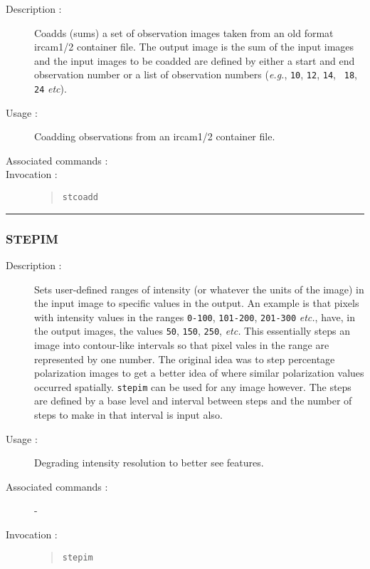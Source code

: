\begin{description}

\item[Description :] Coadds (sums) a set of observation images taken
from an old format {\sc ircam1/2} container file.  The output image is
the sum of the input images and the input images to be coadded are
defined by either a start and end observation number or a list of
observation numbers (\emph{e.g.}, {\tt 10}, {\tt 12}, {\tt 14}, {\tt
18}, {\tt 24} \emph{etc}).

\item[Usage :] Coadding observations from an {\sc ircam1/2} container file.
\item[Associated commands :] {\tt {}}
\item[Invocation :]

\begin{quote}{\tt  stcoadd }\end{quote}

\end{description}

\hrule
\subsubsection*{\label{STEPIM}STEPIM}

\begin{description}

\item[Description :] Sets user-defined ranges of intensity (or whatever
the units of the image) in the input image to specific values in the
output.  An example is that pixels with intensity values in the ranges
{\tt 0-100}, {\tt 101-200}, {\tt 201-300} \emph{etc.}, have, in the
output images, the values {\tt 50}, {\tt 150}, {\tt 250}, \emph{etc.}
This essentially steps an image into contour-like intervals so that
pixel vales in the range are represented by one number.  The original
idea was to step percentage polarization images to get a better idea of
where similar polarization values occurred spatially.  {\tt stepim} can be
used for any image however.  The steps are defined by a base level and
interval between steps and the number of steps to make in that interval
is input also.

\item[Usage :] Degrading intensity resolution to better see features.
\item[Associated commands :] -
\item[Invocation :]

\begin{quote}{\tt  stepim }\end{quote}

\end{description}

